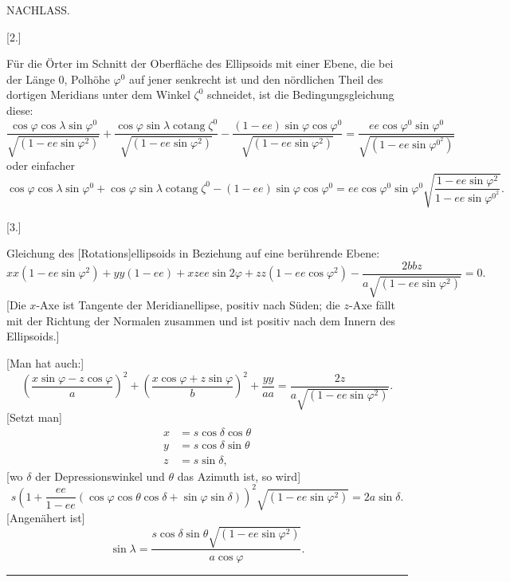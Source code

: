 \clearpage
{}\hfill NACHLASS.\hfill\mbox{}\par
\begin{center}[2.]\par
[Gleichung der Verticalebene des Rotationsellipsoids.]\end{center}
Für die Örter im Schnitt der Oberfläche des Ellipsoids mit einer Ebene, die bei der Länge $0$, Polhöhe $\varphi^0$ auf jener senkrecht ist und den nördlichen Theil des dortigen Meridians unter dem Winkel $\zeta^0$ schneidet, ist die Bedingungsgleichung diese:
\[
\frac{\cos\varphi\cos\lambda\sin\varphi^0}{\sqrt{(1-ee\sin\varphi^2)}}+\frac{\cos\varphi\sin\lambda\operatorname{cotang}\zeta^0}{\sqrt{(1-ee\sin\varphi^2)}}-\frac{(1-ee)\sin\varphi\cos\varphi^0}{\sqrt{(1-ee\sin\varphi^2)}}=\frac{ee\cos\varphi^0\sin\varphi^0}{\sqrt{(1-ee\sin\varphi^{0^2})}}
\]
oder einfacher
\[
\cos\varphi\cos\lambda\sin\varphi^0+\cos\varphi\sin\lambda\operatorname{cotang}\zeta^0-(1-ee)\sin\varphi\cos\varphi^0=ee\cos\varphi^0\sin\varphi^0\sqrt{\frac{1-ee\sin\varphi^2}{1-ee\sin\varphi^{0^2}}}.
\]
\begin{center}[3.]\end{center}
Gleichung des [Rotations]ellipsoids in Beziehung auf eine berührende Ebene:
\[
xx(1-ee\sin\varphi^2)+yy(1-ee)+xzee\sin2\varphi+zz(1-ee\cos\varphi^2)-\frac{2bbz}{a\sqrt{(1-ee\sin\varphi^2)}}=0.
\]
[Die $x$-Axe ist Tangente der Meridianellipse, positiv nach Süden; die $z$-Axe fällt mit der Richtung der Normalen zusammen und ist positiv nach dem Innern des Ellipsoids.]

[Man hat auch:]
\[
\left(\frac{x\sin\varphi-z\cos\varphi}{a}\right)^2+\left(\frac{x\cos\varphi+z\sin\varphi}{b}\right)^2+\frac{yy}{aa}=\frac{2z}{a\sqrt{(1-ee\sin\varphi^2)}}.
\]
[Setzt man]
\[
\begin{aligned}
x&=s\cos\delta\cos\theta\\
y&=s\cos\delta\sin\theta\\
z&=s\sin\delta,
\end{aligned}
\]
[wo $\delta$ der Depressionswinkel und $\theta$ das Azimuth ist, so wird]
\[
s\left(1+\frac{ee}{1-ee}(\cos\varphi\cos\theta\cos\delta+\sin\varphi\sin\delta)\right)^2\sqrt{(1-ee\sin\varphi^2)}=2a\sin\delta.
\]
[Angenähert ist]
\[
\sin\lambda=\frac{s\cos\delta\sin\theta\sqrt{(1-ee\sin\varphi^2)}}{a\cos\varphi}.
\]
\begin{center}\rule{.18\textwidth}{.4pt}\end{center}


